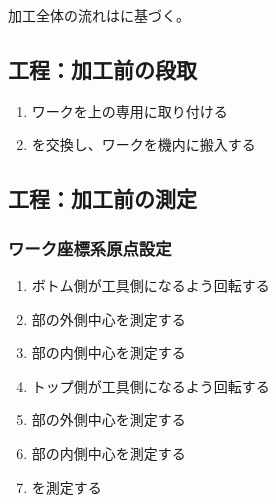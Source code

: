 




加工全体の流れはに基づく。


\subsection{工程：加工前の段取}
\begin{enumerate}[label*=\sarrow]
\item ワークを\Table 上の専用\Jig に取り付ける
\item \Palette を交換し、ワークを機内に搬入する
\end{enumerate}


\subsection{工程：加工前の測定}

\subsubsection{ワーク座標系原点設定}
\begin{enumerate}[label*=\sarrow]
\item ボトム側が工具側になるよう回転する
\item \BottomEndFace 部の外側中心を測定する
\item \BottomEndFace 部の内側中心を測定する
\item トップ側が工具側になるよう回転する
\item \TopEndFace 部の外側中心を測定する
\item \TopEndFace 部の内側中心を測定する
\item \KeywayCenter を測定する
\end{enumerate}

